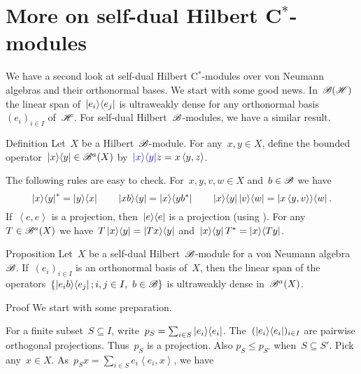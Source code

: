 \documentclass[b]{subfiles}
\begin{document}
\section{More on self-dual Hilbert C$^*$-modules}
\begin{parsec}%
\begin{point}%
We have a second look at
    self-dual Hilbert C$^*$-modules over von Neumann algebras
    and their orthonormal bases.
We start with some good news.
In~$\mathscr{B}(\mathscr{H})$ the linear span of~$\left|e_i\right>\!\left<e_j\right|$
    is ultraweakly dense for any orthonormal basis~$(e_i)_{i \in I}$
    of~$\mathscr{H}$.
For self-dual Hilbert~$\mathscr{B}$-modules, we have a similar result.
\end{point}
\begin{point}{Definition}%
Let~$X$ be a Hilbert~$\mathscr{B}$-module.
For any~$x, y \in X$,
define the bounded operator~$\left|x\right>\!\left<y\right| \in \mathscr{B}^a(X)$
by~$\Define{\ketbra{x}{y}}\index{*ketbra@$\ketbra{x}{y}$} z = x \left<y,z\right>$.
\begin{point}%
The following rules are easy to check.
For~$x,y,v,w \in X$ and~$b \in \mathscr{B}$
    we have
\begin{equation*}
\left|x\right>\!\left<y\right|^* = \left|y\right>\!\left<x\right| \qquad
\left|xb\right>\!\left<y\right| = \left|x\right>\!\left<yb^*\right| \qquad
\left|x\right>\!\left<y\right| \left|v\right>\!\left<w\right| = \left|x\left<y,v\right>\right>\!\left<w\right|.
\end{equation*}
If~$\left<e,e\right>$ is a projection,
    then~$\left|e\right>\!\left<e\right|$ is a projection
    (using ).
For any~$T \in \mathscr{B}^a(X)$
    we have~$T \left|x\right>\!\left<y\right| = \left|Tx\right>\!\left<y\right|$
    and~$\left|x\right>\!\left<y\right|T^* = \left|x\right>\!\left<Ty\right|$.
\end{point}
\end{point}
\begin{point}{Proposition}%
Let~$X$ be a self-dual Hilbert~$\mathscr{B}$-module
    for a von Neumann algebra~$\mathscr{B}$.
If~$(e_i)_{i \in I}$ is an orthonormal basis of~$X$,
then the linear span of
    the operators~$\{ \left|e_i b\right>\!\left<e_j\right|; i,j \in I, \ b \in \mathscr{B}\}$
    is ultraweakly dense in~$\mathscr{B}^a(X)$.
\begin{point}{Proof}%
We start with some preparation.
\begin{point}%
For a finite subset~$S \subseteq I$,
    write~$p_S = \sum_{i \in S} \left|e_i\right>\!\left<e_i\right|$.
The~$(\left|e_i\right>\!\left<e_i\right|)_{i \in I}$ are pairwise orthogonal projections.
Thus~$p_S$ is a projection.
Also $p_S \leq p_{S'}$ when~$S \subseteq S'$.
Pick any~$x \in X$.
As~$p_S x = \sum_{i \in S} e_i \left<e_i, x\right>$, we have
\begin{equation*}

\end{equation*}
\end{point}
\end{point}
\end{point}
\end{parsec}
\end{document}
